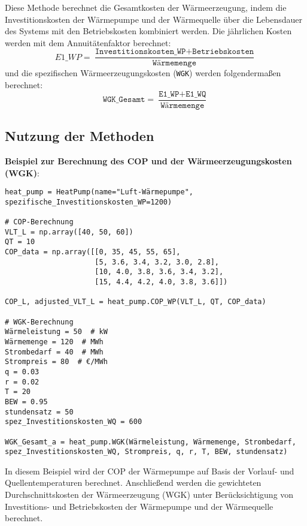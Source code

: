 \begin{itemize}
    Diese Methode berechnet die Gesamtkosten der Wärmeerzeugung, indem die Investitionskosten der Wärmepumpe und der Wärmequelle über die Lebensdauer des Systems mit den Betriebskosten kombiniert werden. Die jährlichen Kosten werden mit dem Annuitätenfaktor berechnet:
    \[
    E1\_WP = \frac{ \texttt{Investitionskosten\_WP} + \texttt{Betriebskosten} }{\texttt{Wärmemenge}}
    \]
    und die spezifischen Wärmeerzeugungskosten (\texttt{WGK}) werden folgendermaßen berechnet:
    \[
    \texttt{WGK\_Gesamt} = \frac{\texttt{E1\_WP} + \texttt{E1\_WQ}}{\texttt{Wärmemenge}}
    \]
\end{itemize}

\subsection{Nutzung der Methoden}
\textbf{Beispiel zur Berechnung des COP und der Wärmeerzeugungskosten (WGK)}:

\begin{verbatim}
heat_pump = HeatPump(name="Luft-Wärmepumpe", spezifische_Investitionskosten_WP=1200)

# COP-Berechnung
VLT_L = np.array([40, 50, 60])
QT = 10
COP_data = np.array([[0, 35, 45, 55, 65],
                     [5, 3.6, 3.4, 3.2, 3.0, 2.8],
                     [10, 4.0, 3.8, 3.6, 3.4, 3.2],
                     [15, 4.4, 4.2, 4.0, 3.8, 3.6]])

COP_L, adjusted_VLT_L = heat_pump.COP_WP(VLT_L, QT, COP_data)

# WGK-Berechnung
Wärmeleistung = 50  # kW
Wärmemenge = 120  # MWh
Strombedarf = 40  # MWh
Strompreis = 80  # €/MWh
q = 0.03
r = 0.02
T = 20
BEW = 0.95
stundensatz = 50
spez_Investitionskosten_WQ = 600

WGK_Gesamt_a = heat_pump.WGK(Wärmeleistung, Wärmemenge, Strombedarf, spez_Investitionskosten_WQ, Strompreis, q, r, T, BEW, stundensatz)
\end{verbatim}
In diesem Beispiel wird der COP der Wärmepumpe auf Basis der Vorlauf- und Quellentemperaturen berechnet. Anschließend werden die gewichteten Durchschnittskosten der Wärmeerzeugung (WGK) unter Berücksichtigung von Investitions- und Betriebskosten der Wärmepumpe und der Wärmequelle berechnet.
